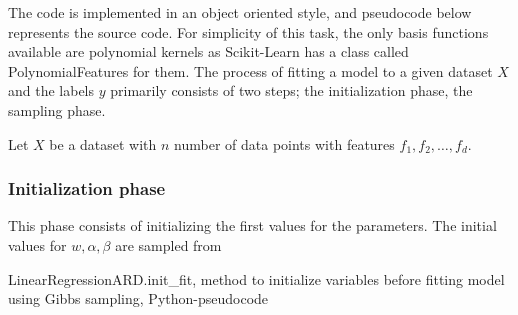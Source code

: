 \documentclass[12pt]{article}
\begin{document}
        The code is implemented in an object oriented style, and pseudocode below represents the source code. For simplicity of this task, the only basis functions available are polynomial kernels as Scikit-Learn has a class called PolynomialFeatures \cite{PolynomialFeatures} for them. The process of fitting a model to a given dataset $X$ and the labels $y$ primarily consists of two steps; the initialization phase, the sampling phase.

        Let $X$ be a dataset with $n$ number of data points with features $f_1, f_2, \ldots, f_d$.

        \subsubsection{Initialization phase}
            This phase consists of initializing the first values for the parameters. The initial values for $w, \alpha, \beta$ are sampled from
            \begin{algorithm}[H]
                \caption{LinearRegressionARD.init\_fit, method to initialize variables before fitting model using Gibbs sampling, Python-pseudocode}
                \label{alg:LinearRegressionARD}
                \begin{algorithmic}[1]
                    \algonewline{}
                    \algonewline{}
                \end{algorithmic}
            \end{algorithm}
\end{document}
